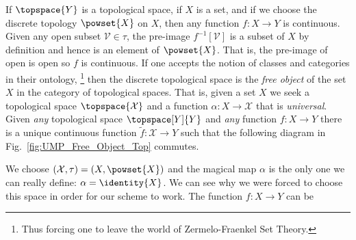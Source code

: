         \begin{example}
            If $\topspace{Y}$ is a topological space, if $X$ is a set,
            and if we choose the discrete topology $\powset{X}$ on $X$,
            then any function $f:X\rightarrow{Y}$ is continuous. Given
            any open subset $\mathcal{V}\in\tau$, the pre-image
            $f^{\minus{1}}[\mathcal{V}]$ is a subset of $X$ by
            definition and hence is an element of $\powset{X}$. That is,
            the pre-image of open is open so $f$ is continuous. If one
            accepts the notion of classes and categories in their
            ontology,%
            \footnote{%
                Thus forcing one to leave the world of Zermelo-Fraenkel
                Set Theory.%
            }
            then the discrete topological space is the
            \textit{free object} of the set $X$ in the category of
            topological spaces. That is, given a set $X$ we seek a
            topological space $\topspace{\mathcal{X}}$ and a function
            $\alpha:X\rightarrow\mathcal{X}$ that is \textit{universal}.
            Given \textit{any} topological space $\topspace[Y]{Y}$ and
            \textit{any} function $f:X\rightarrow{Y}$ there is a unique
            continuous function $\tilde{f}:\mathcal{X}\rightarrow{Y}$
            such that the following diagram in Fig.~\ref{fig:UMP_Free_Object_Top}
            commutes.
            \par\hfill\par
            \hfill
            \begin{minipage}[b]{0.588\textwidth}
                We choose $(\mathcal{X},\tau)=(X,\powset{X})$ and the
                magical map $\alpha$ is the only one we can really
                define: $\alpha=\identity{X}$. We can see why we were
                forced to choose this space in order for our scheme to
                work. The function $f:X\rightarrow{Y}$ can be

\end{minipage}
\end{example}
